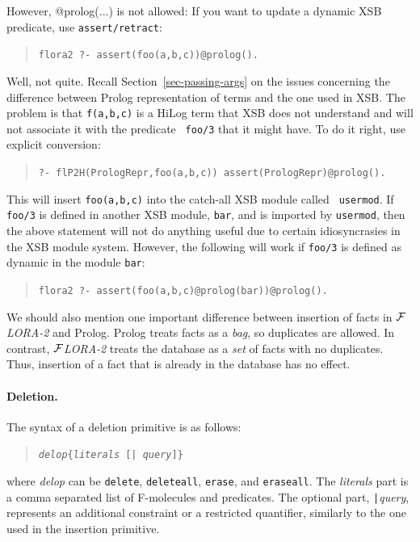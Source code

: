 \documentclass[11pt]{article}
\newcommand{\FLORA}{{\mbox{${\cal F}${\small\it LORA}\rm\emph{-2}}}\xspace}
\begin{document}
However, @prolog(...) is not allowed: If you want to update a dynamic XSB
predicate, use {\tt assert/retract}:
\begin{quote}
 {\tt flora2 ?- assert(foo(a,b,c))@prolog().  }
\end{quote}
Well, not quite. Recall Section~\ref{sec-passing-args} on the issues
concerning the difference between Prolog representation of terms and the
one used in XSB. The problem is that {\tt f(a,b,c)} is a HiLog term that
XSB does not understand and will not associate it with the predicate {\tt
  foo/3}  that it might have. To do it right, use explicit conversion:
\begin{quote}
 {\tt ?- flP2H(PrologRepr,foo(a,b,c)) assert(PrologRepr)@prolog().  }
\end{quote}
This will insert {\tt foo(a,b,c)} into the catch-all XSB module called {\tt
  usermod}. If {\tt foo/3} is defined in another XSB module, {\tt bar}, and
is imported by {\tt usermod}, then the above statement will not do anything
useful due to certain idiosyncrasies in the XSB module system.  However,
the following will work if {\tt foo/3} is defined as dynamic in the module
  {\tt bar}:
\begin{quote}
 {\tt flora2 ?- assert(foo(a,b,c)@prolog(bar))@prolog().  }  
\end{quote}

We should also mention one important difference between insertion of facts
in \FLORA and Prolog. Prolog treats facts as a \emph{bag}, so duplicates
are allowed. In contrast, \FLORA treats the database as a \emph{set} of
facts with no duplicates. Thus, insertion of a fact that is already in the
database has no effect.


%
\paragraph{Deletion.} The syntax of a deletion primitive is as follows:
\begin{quote}
{\tt \emph{delop}\{\emph{literals} [| \emph{query}]\}}
\end{quote}
where {\it delop} can be {\tt delete}, {\tt deleteall}, {\tt erase}, and
{\tt eraseall}. The {\it literals} part is a comma separated list of
F-molecules and predicates. The optional part, {\tt |}\emph{query},
represents an additional constraint or a restricted quantifier, similarly
to the one used in the insertion primitive.
\end{document}
